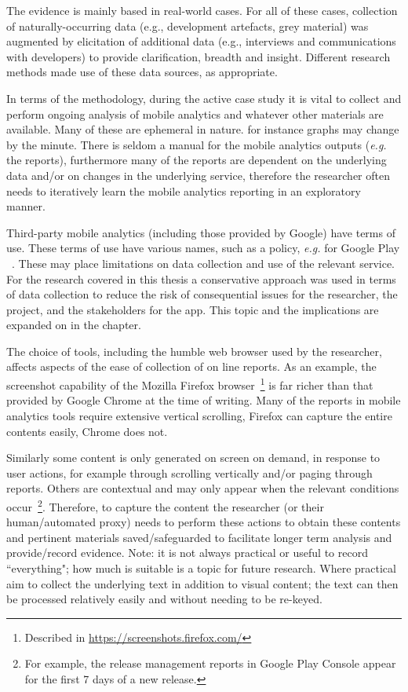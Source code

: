 The evidence is mainly based in real-world cases. For all of these cases, collection of naturally-occurring data (e.g., development artefacts, grey material) was augmented by elicitation of additional data (e.g., interviews and communications with developers) to provide clarification, breadth and insight.  Different research methods made use of these data sources, as appropriate.

In terms of the methodology, during the active case study it is vital to collect and perform ongoing analysis of mobile analytics and whatever other materials are available. Many of these are ephemeral in nature. for instance graphs may change by the minute. There is seldom a manual for the mobile analytics outputs (\textit{e.g.} the reports), furthermore many of the reports are dependent on the underlying data and/or on changes in the underlying service, therefore the researcher often needs to iteratively learn the mobile analytics reporting in an exploratory manner.


Third-party mobile analytics (including those provided by Google) have terms of use. These terms of use have various names, such as a policy, \textit{e.g.} for Google Play ~\citet{google_play_developer_policy_center}. These may place limitations on data collection and use of the relevant service. For the research covered in this thesis a conservative approach was used in terms of data collection to reduce the risk of consequential issues for the researcher, the project, and the stakeholders for the app. This topic and the implications are expanded on in the  chapter.

The choice of tools, including the humble web browser used by the researcher, affects aspects of the ease of collection of on line reports. As an example, the screenshot capability of the Mozilla Firefox browser~\footnote{Described in \url{https://screenshots.firefox.com/}} is far richer than that provided by Google Chrome at the time of writing. Many of the reports in mobile analytics tools require extensive vertical scrolling, Firefox can capture the entire contents easily, Chrome does not. 

Similarly some content is only generated on screen on demand, in response to user actions, for example through scrolling vertically and/or paging through reports. Others are contextual and may only appear when the relevant conditions occur~\footnote{For example, the release management reports in Google Play Console appear for the first 7 days of a new release.}. Therefore, to capture the content the researcher (or their human/automated proxy) needs to perform these actions to obtain these contents and pertinent materials saved/safeguarded to facilitate longer term analysis and provide/record evidence. Note: it is not always practical or useful to record ``everything"; how much is suitable is a topic for future research. Where practical aim to collect the underlying text in addition to visual content; the text can then be processed relatively easily and without needing to be re-keyed.



